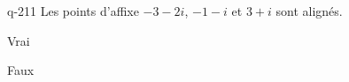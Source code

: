 \begin{truefalse}{q-211}
Les points d'affixe $-3-2i$, $-1-i$ et $3+i$ sont alignés.
\item* Vrai
\item Faux
\end{truefalse}

